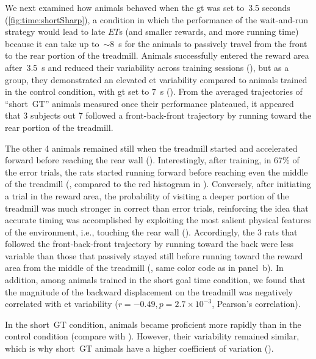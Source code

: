 We next examined how animals behaved when the \gls{gt} was set to~3.5 seconds (\autoref{fig:time:shortSharp}), a condition in which the performance of the wait-and-run strategy would lead to late $ET$s (and smaller rewards, and more running time) because it can take up to~$\sim$8~s for the animals to passively travel from the front to the rear portion of the treadmill.
Animals successfully entered the reward area after~3.5~s and reduced their variability across training sessions (), but as a group, they demonstrated an elevated \gls{et} variability compared to animals trained in the control condition, with \gls{gt} set to 7~s ().
From the averaged trajectories of ``short~GT'' animals measured once their performance plateaued, it appeared that 3 subjects out 7 followed a front-back-front trajectory by running toward the rear portion of the treadmill.

The other 4 animals remained still when the treadmill started and accelerated forward before reaching the rear wall ().
Interestingly, after training, in 67\% of the error trials, the rats started running forward before reaching even the middle of the treadmill (, compared to the red histogram in ).
Conversely, after initiating a trial in the reward area, the probability of visiting a deeper portion of the treadmill was much stronger in correct than error trials, reinforcing the idea that accurate timing was accomplished by exploiting the most salient physical features of the environment, i.e., touching the rear wall ().
Accordingly, the 3 rats that followed the front-back-front trajectory by running toward the back were less variable than those that passively stayed still before running toward the reward area from the middle of the treadmill (, same color code as in panel~b).
In addition, among animals trained in the short goal time condition, we found that the magnitude of the backward displacement on the treadmill was negatively correlated with \gls{et} variability ($r=-0.49, p=2.7\times 10^{-3}$, Pearson's correlation).
\par
In the short~GT condition, animals became proficient more rapidly than in the control condition (compare  with ).
However, their variability remained similar, which is why short~GT animals have a higher coefficient of variation ().
